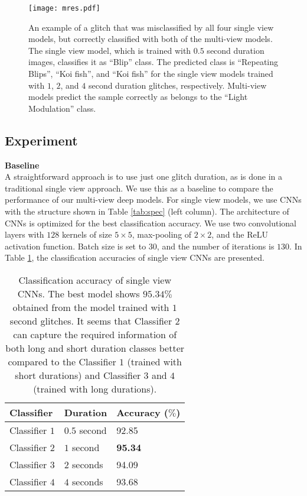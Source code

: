 \documentclass{article}
\begin{document}
\begin{figure*}[t!]
\centering
\texttt{[image: mres.pdf]}
\caption{An example of a glitch that was misclassified by all four single view models, but correctly classified with both of the multi-view models. The single view model, which is trained with $0.5$ second duration images, classifies it as ``Blip'' class. The predicted class is ``Repeating Blips'', ``Koi fish'', and ``Koi fish'' for the single view models trained with $1$, $2$, and $4$ second duration glitches, respectively. Multi-view models predict the sample correctly as belongs to the ``Light Modulation'' class. }
\label{fig:mis}
\end{figure*}
\subsection{Experiment}
\noindent
\textbf{Baseline}\\
A straightforward approach is to use just one glitch duration, as is done in a traditional single view approach. We use this as a baseline to compare the performance of our multi-view deep models. For single view models, we use CNNs with the structure shown in Table \ref{tab:spec} (left column). The architecture of CNNs is optimized for the best classification accuracy. We use two convolutional layers with $128$ kernels of size $5 \times 5$, max-pooling of $2 \times 2$, and the ReLU activation function. Batch size is set to $30$, and the number of iterations is $130$. In Table \ref{tab:sin1}, the classification accuracies of single view CNNs are presented.
\begin{table}[h!]
\centering
\caption{Classification accuracy of single view CNNs. The best model shows $95.34\%$ obtained from the model trained with $1$ second glitches. It seems that Classifier $2$ can capture the required information of both long and short duration classes better compared to the Classifier $1$ (trained with short durations) and Classifier $3$ and $4$ (trained with long durations).}

\label{tab:sin1}
\begin{tabular}{l|l|l}
Classifier & Duration & Accuracy ($\%$) \\ \hline
Classifier $1$ & $0.5$ second & 92.85 \\
Classifier $2$ & $1$ second & \textbf{95.34} \\
Classifier $3$ & $2$ seconds & 94.09 \\
Classifier $4$ & $4$ seconds & 93.68     
\end{tabular}
\end{table}
\end{document}
